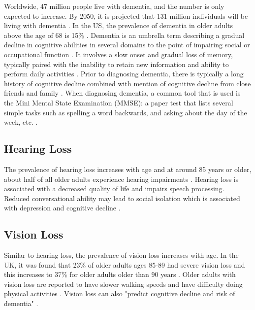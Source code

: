 Worldwide, 47 million people live with dementia, and the number is only expected to increase. By 2050, it is projected that 131 million individuals will be living with dementia \cite{noauthor_diagnosis_nodate}. In the US, the prevalence of dementia in older adults above the age of 68 is 15\% \cite{noauthor_diagnosis_nodate}. Dementia is an umbrella term describing a gradual decline in cognitive abilities in several domains to the point of impairing social or occupational function \cite{noauthor_diagnosis_nodate}. It involves a slow onset and gradual loss of memory, typically paired with the inability to retain new information and ability to perform daily activities \cite{noauthor_diagnosis_nodate}. Prior to diagnosing dementia, there is typically a long history of cognitive decline combined with mention of cognitive decline from close friends and family \cite{noauthor_diagnosis_nodate}. When diagnosing dementia, a common tool that is used is the Mini Mental State Examination (MMSE): a paper test that lists several simple tasks such as spelling a word backwards, and asking about the day of the week, etc. \cite{arevalo-rodriguez_mini-mental_2015}. 

\subsection{Hearing Loss}
The prevalence of hearing loss increases with age and at around 85 years or older, about half of all
older adults experience hearing impairments \cite{desai_trends_2001}. Hearing loss is associated with a decreased quality of life and impairs speech processing. Reduced conversational ability may lead to social isolation which is associated with depression and cognitive decline \cite{jaul_age-related_2017}.

\subsection{Vision Loss}
Similar to hearing loss, the prevalence of vision loss increases with age. In the UK, it was found that 23\% of older adults ages 85-89 had severe vision loss and this increases to 37\% for older adults older than 90 years \cite{evans_prevalence_2002}. Older adults with vision loss are reported to have slower walking speeds and have difficulty doing physical activities \cite{swenor_aging_2020}. Vision loss can also "predict cognitive decline and risk of dementia" \cite{swenor_aging_2020}.


